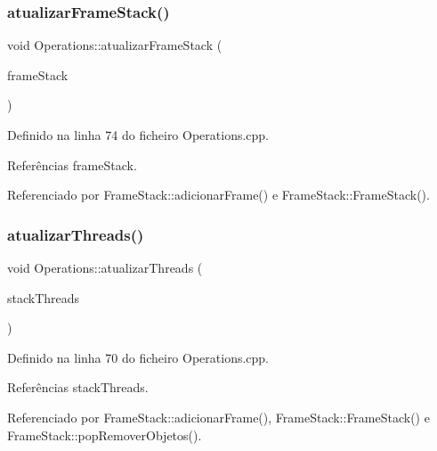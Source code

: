 \subsubsection{\texorpdfstring{atualizar\+Frame\+Stack()}{atualizarFrameStack()}}
{\footnotesize\ttfamily void Operations\+::atualizar\+Frame\+Stack (\begin{DoxyParamCaption}\item[{\hyperlink{classFrameStack}{Frame\+Stack} $\ast$}]{frame\+Stack }\end{DoxyParamCaption})\hspace{0.3cm}{\ttfamily [static]}}



Definido na linha 74 do ficheiro Operations.\+cpp.



Referências frame\+Stack.



Referenciado por Frame\+Stack\+::adicionar\+Frame() e Frame\+Stack\+::\+Frame\+Stack().

\mbox{\label{classOperations_a6c265501b41e227e1a15589a0bb03166}} 
\subsubsection{\texorpdfstring{atualizar\+Threads()}{atualizarThreads()}}
{\footnotesize\ttfamily void Operations\+::atualizar\+Threads (\begin{DoxyParamCaption}\item[{stack$<$ struct \hyperlink{structframe__s}{frame\+\_\+s} $\ast$$>$ $\ast$}]{stack\+Threads }\end{DoxyParamCaption})\hspace{0.3cm}{\ttfamily [static]}}



Definido na linha 70 do ficheiro Operations.\+cpp.



Referências stack\+Threads.



Referenciado por Frame\+Stack\+::adicionar\+Frame(), Frame\+Stack\+::\+Frame\+Stack() e Frame\+Stack\+::pop\+Remover\+Objetos().

\mbox{\label{classOperations_afdf1759637e332569a2b2b17067e05f0}} 
